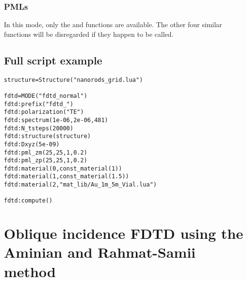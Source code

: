 %

\subsubsection{PMLs}

In this mode, only the  and  functions are available. The other four similar functions will be disregarded if they happen to be called.

\subsection{Full script example}

\begin{lstlisting}
structure=Structure("nanorods_grid.lua")

fdtd=MODE("fdtd_normal")
fdtd:prefix("fdtd_")
fdtd:polarization("TE")
fdtd:spectrum(1e-06,2e-06,481)
fdtd:N_tsteps(20000)
fdtd:structure(structure)
fdtd:Dxyz(5e-09)
fdtd:pml_zm(25,25,1,0.2)
fdtd:pml_zp(25,25,1,0.2)
fdtd:material(0,const_material(1))
fdtd:material(1,const_material(1.5))
fdtd:material(2,"mat_lib/Au_1m_5m_Vial.lua")

fdtd:compute()
\end{lstlisting}

\section{Oblique incidence FDTD using the Aminian and Rahmat-Samii method} 


